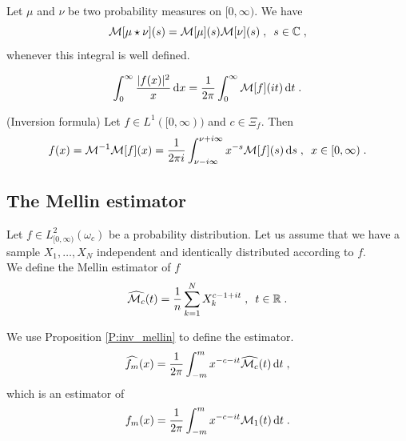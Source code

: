 \begin{proposition} 
\label{P:mellinConvol}
Let $\mu$ and $\nu$ be two probability measures on $[0, \infty)$. We have
    \begin{equation*}
        \mathcal{M}[\mu \star \nu](s) = \mathcal{M}[\mu](s) \mathcal{M}[\nu](s)
    \; , \enspace 
    s \in \mathbb{C}
    \; ,
    \end{equation*}
whenever this integral is well defined.\\
\end{proposition}

\begin{proposition}
\label{P:melParseval}
    \begin{equation}
        \int_0^\infty \frac{|f(x)|^2}{x} \,\mathrm{d} x 
        = 
        \frac{1}{2\pi} \int_0^\infty \mathcal{M}[f](it) \,\mathrm{d} t
        \; .
    \end{equation}
\end{proposition}

\begin{proposition}(Inversion formula)
\label{P:inv_mellin} Let $f \in L^1([0, \infty))$ and $c \in \Xi_f$. Then 
    \begin{equation*}
    f(x) = \mathcal{M}^{-1} \mathcal{M}[f](x) =  \frac{1}{2\pi i }\int_{\nu -i \infty}^{\nu + i\infty} x^{-s}  \mathcal{M}[f](s) \,\mathrm{d} s
    \; , \enspace
    x \in [0, \infty)
    \; .
    \end{equation*}
\end{proposition}

\subsection{The Mellin estimator}
\label{sec:mellin_estimator}
Let $f \in L^2_{[0, \infty)}(\omega_c)$ be a probability distribution. Let us assume that we have a sample $X_1, \ldots,X_N$ independent and identically distributed according to $f$. \\

We define the Mellin estimator of $f$
\begin{equation*}
    \widehat{\mathcal{M}_c}(t) = \frac{1}{n} \sum_{k = 1}^{N} X_{k}^{c - 1 + it}
    \; , \enspace 
    t \in \mathbb{R}
    \; .
\end{equation*}

We use Proposition \ref{P:inv_mellin} to define the estimator. 
\begin{equation*}
    \widehat{f_m}(x) = \frac{1}{2\pi} \int_{-m}^m x^{-c - it} \widehat{\mathcal{M}_c}(t) \,\mathrm{d} t
    \; ,
\end{equation*}
which is an estimator of 
\begin{equation*}
    f_m(x) = \frac{1}{2\pi} \int_{-m}^m x^{-c - it} \mathcal{M}_1(t) \,\mathrm{d} t
    \; .
\end{equation*}

